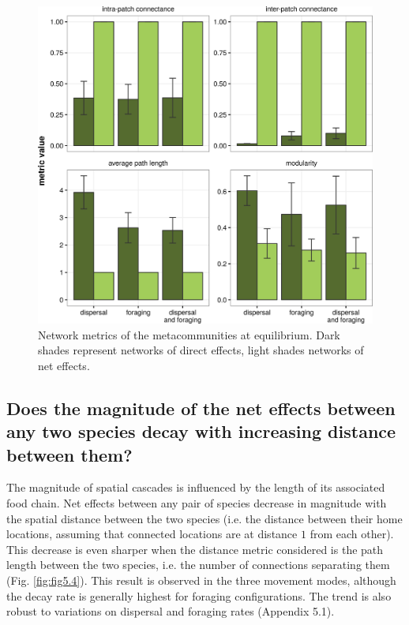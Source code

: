 \begin{figure}[ht]
\includegraphics[width=.7\textwidth,height=\textheight,keepaspectratio]{./Figures/chapter05/Fig_3.png}
\centering
\caption[Metacommunity network metrics]{\color{Gray}Network metrics of the metacommunities at equilibrium. Dark shades represent networks of direct effects, light shades networks of net effects.}\label{fig:fig5.3}
\end{figure}

\FloatBarrier

\subsection*{Does the magnitude of the net effects between any two species decay with increasing distance between them?}

The magnitude of spatial cascades is influenced by the length of its associated food chain. Net effects between any pair of species decrease in magnitude with the spatial distance between the two species (i.e. the distance between their home locations, assuming that connected locations are at distance $1$ from each other). This decrease is even sharper when the distance metric considered is the path length between the two species, i.e. the number of connections separating them (Fig. \ref{fig:fig5.4}). This result is observed in the three movement modes, although the decay rate is generally highest for foraging configurations. The trend is also robust to variations on dispersal and foraging rates (Appendix 5.1).

